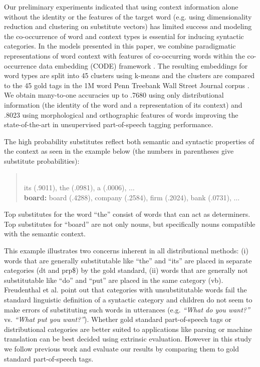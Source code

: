 Our preliminary experiments indicated that using context information
alone without the identity or the features of the target word
(e.g. using dimensionality reduction and clustering on substitute
vectors) has limited success and modeling the co-occurrence of word
and context types is essential for inducing syntactic categories.  In
the models presented in this paper, we combine paradigmatic
representations of word context with features of co-occurring words
within the co-occurrence data embedding (CODE) framework
\cite{globerson2007euclidean,maron2010sphere}.  The resulting
embeddings for word types are split into 45 clusters using k-means and
the clusters are compared to the 45 gold tags in the 1M word Penn
Treebank Wall Street Journal corpus \cite{treebank3}.  We obtain
many-to-one accuracies up to .7680 using only distributional
information (the identity of the word and a representation of its
context) and .8023 using morphological and orthographic features of
words improving the state-of-the-art in unsupervised part-of-speech
tagging performance.

The high probability substitutes reflect both semantic and syntactic
properties of the context as seen in the example below (the numbers in
parentheses give substitute probabilities):

\begin{quotation}
\\

 its (.9011), the (.0981), a (.0006), $\ldots$\\
{\bf board:} board (.4288), company (.2584), firm (.2024), bank (.0731), $\ldots$
\end{quotation}

Top substitutes for the word ``the'' consist of words that can act as
determiners.  Top substitutes for ``board'' are not only nouns, but
specifically nouns compatible with the semantic context.

This example illustrates two concerns inherent in all distributional
methods: (i) words that are generally substitutable like ``the'' and
``its'' are placed in separate categories ({\sc dt} and {\sc prp\$})
by the gold standard, (ii) words that are generally not substitutable
like ``do'' and ``put'' are placed in the same category ({\sc vb}).
Freudenthal et al.  point out
that categories with unsubstitutable words fail the standard
linguistic definition of a syntactic category and children do not seem
to make errors of substituting such words in utterances
(e.g. {\em``What do you want?''}  vs. {\em *``What put you want?''}).
Whether gold standard part-of-speech tags or distributional categories
are better suited to applications like parsing or machine translation
can be best decided using extrinsic evaluation.  However in this study
we follow previous work and evaluate our results by comparing them to
gold standard part-of-speech tags.

